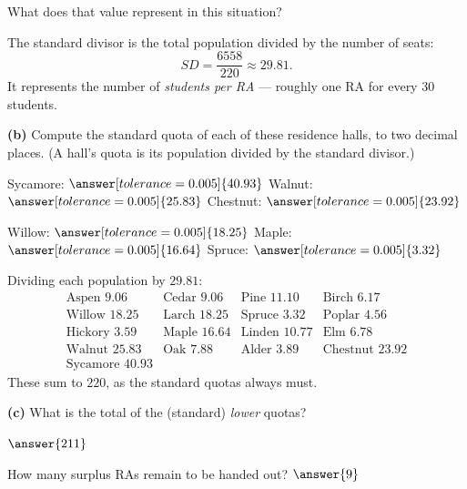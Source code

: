 \documentclass[12pt]{ximera}
\begin{document}
\begin{problem}
\begin{prompt}
\smallskip
What does that value represent in this situation?
\begin{multipleChoice}
\end{multipleChoice}

\begin{feedback}
The standard divisor is the total population divided by the number of seats:
\[ SD = \frac{6558}{220} \approx 29.81. \]
It represents the number of \emph{students per RA} --- roughly one RA for every $30$
students.
\end{feedback}
\end{prompt}

\begin{prompt}
\textbf{(b)} Compute the standard quota of each of these residence halls, to two
decimal places. (A hall's quota is its population divided by the standard divisor.)

Sycamore: $\answer[tolerance=0.005]{40.93}$ \qquad
Walnut: $\answer[tolerance=0.005]{25.83}$ \qquad
Chestnut: $\answer[tolerance=0.005]{23.92}$

\smallskip
Willow: $\answer[tolerance=0.005]{18.25}$ \qquad
Maple: $\answer[tolerance=0.005]{16.64}$ \qquad
Spruce: $\answer[tolerance=0.005]{3.32}$

\begin{feedback}
Dividing each population by $29.81$:
\[
\begin{array}{llll}
\text{Aspen } 9.06 & \text{Cedar } 9.06 & \text{Pine } 11.10 & \text{Birch } 6.17\\
\text{Willow } 18.25 & \text{Larch } 18.25 & \text{Spruce } 3.32 & \text{Poplar } 4.56\\
\text{Hickory } 3.59 & \text{Maple } 16.64 & \text{Linden } 10.77 & \text{Elm } 6.78\\
\text{Walnut } 25.83 & \text{Oak } 7.88 & \text{Alder } 3.89 & \text{Chestnut } 23.92\\
\text{Sycamore } 40.93 & & &
\end{array}
\]
These sum to $220$, as the standard quotas always must.
\end{feedback}
\end{prompt}

\begin{prompt}
\textbf{(c)} What is the total of the (standard) \emph{lower} quotas?

$\answer{211}$

\smallskip
How many surplus RAs remain to be handed out? $\answer{9}$


\end{prompt}
\end{problem}
\end{document}
